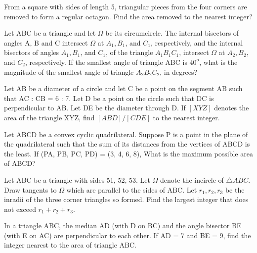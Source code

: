 \item From a square with sides of length 5, triangular pieces from the four corners are removed to form a regular octagon. Find the area removed to the nearest integer?

\item Let ABC be a triangle and let $\Omega$ be its circumcircle. The internal bisectors of angles A, B and C intersect 
$\Omega$ at $A_1, B_1$, and $C_1$, respectively, and the internal bisectors of angles $A_1, B_1$, and $C_1$, of the triangle $A_1B _1 C_1$, intersect $\Omega$ at $A_2, B_2$, and $C_2$, respectively. If the smallest angle of triangle ABC is $40^{o}$, what is the magnitude of the smallest angle of triangle $A_2 B_2 C_2$, in degrees?

\item Let AB be a diameter of a circle and let C be a point on the segment AB such that AC : CB = 6 : 7. Let D be a point on the circle such that DC is perpendicular to AB. Let DE be the diameter through D. If $[XYZ]$ denotes the area of the triangle XYZ, find $[ABD]/[CDE]$ to the nearest integer.

\item Let ABCD be a convex cyclic quadrilateral. Suppose P is a point in the plane of the quadrilateral such that the sum of its distances from the vertices of ABCD is the least. If (PA, PB, PC, PD) = (3, 4, 6, 8), What is the maximum possible area of ABCD?

\item Let ABC be a triangle with sides 51, 52, 53. Let $\Omega$ denote the incircle of $\triangle ABC$. Draw tangents to
$\Omega$ which are parallel to the sides of ABC. Let $r_{1}, r_{2}, r_{3}$ be the inradii of the three corner triangles so formed. Find the largest integer that does not exceed $r_1 + r_2 + r_3$.

\item In a triangle ABC, the median AD (with D on BC) and the angle bisector BE (with E on AC) are perpendicular to each other. If AD = 7 and BE = 9, find the integer nearest to the area of triangle ABC.
